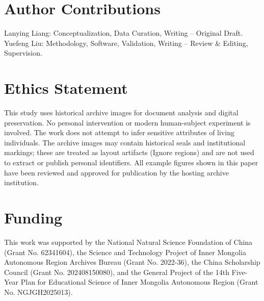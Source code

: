 \documentclass[pdflatex,sn-mathphys-num]{sn-jnl}
\begin{document}
\section*{Author Contributions}
Lanying Liang: Conceptualization, Data Curation, Writing -- Original Draft. Yuefeng Liu: Methodology, Software, Validation, Writing -- Review \& Editing, Supervision.

\section*{Ethics Statement}
This study uses historical archive images for document analysis and digital preservation. No personal intervention or modern human-subject experiment is involved. The work does not attempt to infer sensitive attributes of living individuals. The archive images may contain historical seals and institutional markings; these are treated as layout artifacts (Ignore regions) and are not used to extract or publish personal identifiers. All example figures shown in this paper have been reviewed and approved for publication by the hosting archive institution.

\section*{Funding}
This work was supported by the National Natural Science Foundation of China (Grant No. 62341604), the Science and Technology Project of Inner Mongolia Autonomous Region Archives Bureau (Grant No. 2022-36), the China Scholarship Council (Grant No. 202408150080), and the General Project of the 14th Five-Year Plan for Educational Science of Inner Mongolia Autonomous Region (Grant No. NGJGH2025013).

\clearpage
\end{document}
